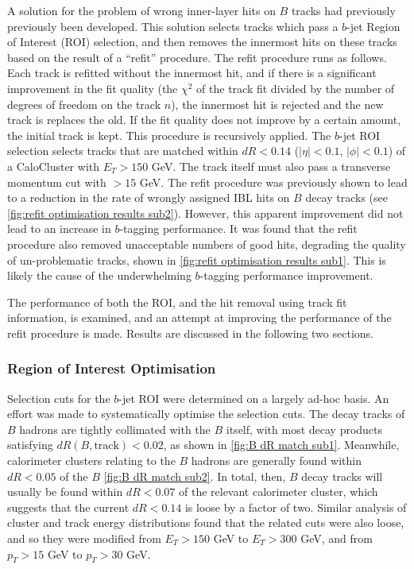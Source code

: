 A solution for the problem of wrong inner-layer hits on $B$ tracks had previously previously been developed. This solution selects tracks which pass a $b$-jet Region of Interest (ROI) selection, and then removes the innermost hits on these tracks based on the result of a ``refit'' procedure. The refit procedure runs as follows. Each track is refitted without the innermost hit, and if there is a significant improvement in the fit quality (the $\chi^2$ of the track fit divided by the number of degrees of freedom on the track $n$), the innermost hit is rejected and the new track is replaces the old. If the fit quality does not improve by a certain amount, the initial track is kept. This procedure is recursively applied. The $b$-jet ROI selection selects tracks that are matched within $dR < 0.14$ ($|\eta| < 0.1$, $|\phi| < 0.1$) of a CaloCluster with $E_T > 150$ GeV. The track itself must also pass a transverse momentum cut with \pT$>15$ GeV. The refit procedure was previously shown to lead to a reduction in the rate of wrongly assigned IBL hits on $B$ decay tracks (see \cref{fig:refit optimisation results sub2}). However, this apparent improvement did not lead to an increase in $b$-tagging performance. It was found that the refit procedure also removed unacceptable numbers of good hits, degrading the quality of un-problematic tracks, shown in \cref{fig:refit optimisation results sub1}. This is likely the cause of the underwhelming $b$-tagging performance improvement. 

The performance of both the ROI, and the hit removal using track fit information, is examined, and an attempt at improving the performance of the refit procedure is made. Results are discussed in the following two sections.

\subsubsection{Region of Interest Optimisation}\label{sec:roi opt}
Selection cuts for the $b$-jet ROI were determined on a largely ad-hoc basis. An effort was made to systematically optimise the selection cuts. The decay tracks of $B$ hadrons are tightly collimated with the $B$ itself, with most decay products satisfying $dR(B, \text{track}) < 0.02$, as shown in \cref{fig:B dR match sub1}. Meanwhile, calorimeter clusters relating to the $B$ hadrons are generally found within $dR < 0.05$ of the $B$ \cref{fig:B dR match sub2}. In total, then, $B$ decay tracks will usually be found within $dR<0.07$ of the relevant calorimeter cluster, which suggests that the current $dR<0.14$ is loose by a factor of two. Similar analysis of cluster and track energy distributions found that the related cuts were also loose, and so they were modified from $E_T > 150$ GeV to $E_T > 300$ GeV, and from $p_T > 15$ GeV to $p_T > 30$ GeV. 

